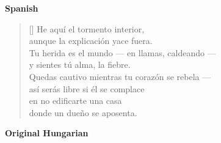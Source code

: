\documentclass[a4paper,12pt,twoside,final]{book}
\begin{document}
\bigskip

\noindent \textbf{Spanish}


\settowidth{\versewidth}{Tu herida es el mundo --- en llamas, caldeando ---}

\begin{verse}[\versewidth]
  He aquí el tormento interior, \\
  aunque la explicación yace fuera. \\
  Tu herida es el mundo --- en llamas, caldeando --- \\
  y sientes tú alma, la fiebre. \\
  Quedas cautivo mientras tu corazón se rebela --- \\
  así serás libre si él se complace \\
  en no edificarte una casa \\
  donde un dueño se aposenta. \\
\end{verse}

\newpage


\noindent \textbf{Original Hungarian}



\settowidth{\versewidth}{nem raksz magadnak olyan házat,}
\end{document}
